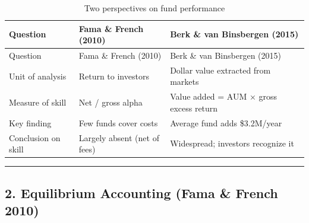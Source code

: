 \documentclass[
  letterpaper,
  DIV=11,
  numbers=noendperiod]{scrartcl}
\begin{document}
\begin{longtable}[]{@{}
  >{\raggedright\arraybackslash}p{}
  >{\raggedright\arraybackslash}p{}
  >{\raggedright\arraybackslash}p{}@{}}
\caption{Two perspectives on fund performance}\tabularnewline
\toprule\noalign{}
\begin{minipage}[b]{\linewidth}\raggedright
Question
\end{minipage} & \begin{minipage}[b]{\linewidth}\raggedright
Fama \& French (2010)
\end{minipage} & \begin{minipage}[b]{\linewidth}\raggedright
Berk \& van Binsbergen (2015)
\end{minipage} \\
\midrule\noalign{}
\endfirsthead
\toprule\noalign{}
\begin{minipage}[b]{\linewidth}\raggedright
Question
\end{minipage} & \begin{minipage}[b]{\linewidth}\raggedright
Fama \& French (2010)
\end{minipage} & \begin{minipage}[b]{\linewidth}\raggedright
Berk \& van Binsbergen (2015)
\end{minipage} \\
\midrule\noalign{}
\endhead
\bottomrule\noalign{}
\endlastfoot
Unit of analysis & Return to investors & Dollar value extracted from
markets \\
Measure of skill & Net / gross alpha & Value added = AUM × gross excess
return \\
Key finding & Few funds cover costs & Average fund adds \$3.2M/year \\
Conclusion on skill & Largely absent (net of fees) & Widespread;
investors recognize it \\
\end{longtable}

\begin{center}\rule{0.5\linewidth}{0.5pt}\end{center}

\subsection{2. Equilibrium Accounting (Fama \& French
2010)}\label{equilibrium-accounting-fama-french-2010}
\end{document}
